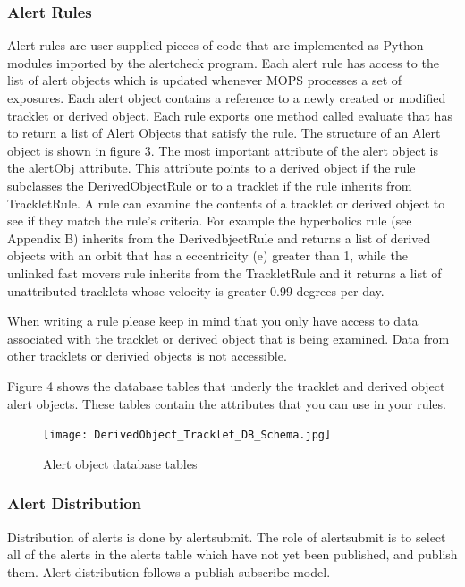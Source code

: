\documentclass[panstarrs]{panstarrs}
\begin{document}
\subsubsection{Alert Rules}
Alert rules are user-supplied pieces of code that are implemented as Python modules imported by the alertcheck program. Each alert rule has access to the list of alert objects which is updated whenever MOPS processes a set of exposures. Each alert object contains a reference to a newly created or modified tracklet or derived object. Each rule exports one method called evaluate that has to return a list of Alert Objects that satisfy the rule. The structure of an Alert object is shown in figure 3. The most important attribute of the alert object is the alertObj attribute. This attribute points to a derived object if the rule subclasses the DerivedObjectRule or to a tracklet if the rule inherits from TrackletRule. A rule can examine the contents of a tracklet or derived object to see if they match the rule's criteria. For example the hyperbolics rule (see Appendix B) inherits from the DerivedbjectRule and returns a list of derived objects with an orbit that has a eccentricity (e) greater than 1, while the unlinked fast movers rule inherits from the TrackletRule and it returns a list of unattributed tracklets whose velocity is greater 0.99 degrees per day.

When writing a rule please keep in mind that you only have access to data associated with the tracklet or derived object that is being examined. Data from other tracklets or derivied objects is not accessible.

Figure 4 shows the database tables that underly the tracklet and derived object alert objects. These tables contain the attributes that you can use in your rules.

\begin{figure}
\begin{center}
\texttt{[image: DerivedObject\_Tracklet\_DB\_Schema.jpg]}
\caption{ Alert object database tables}
\label{fig:do}
\end{center}
\end{figure}

\subsubsection{Alert Distribution}
Distribution of alerts is done by alertsubmit. The role of alertsubmit is to select all of the alerts in the alerts table which have not yet been published, and publish them. Alert distribution follows a publish-subscribe model.
\end{document}
